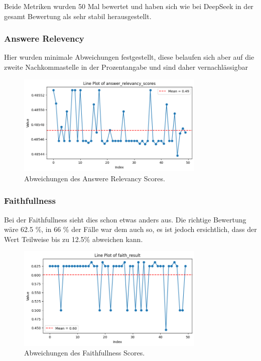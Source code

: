 Beide Metriken wurden 50 Mal bewertet und haben sich wie bei DeepSeek in der gesamt Bewertung als sehr stabil herausgestellt.


\subsubsection{Answere Relevency}
Hier wurden minimale Abweichungen festgestellt, diese belaufen sich aber auf die zweite Nachkommastelle in der Prozentangabe und sind daher vernachlässigbar

\begin{figure}[htbp]
    \centering
    \includegraphics[width=0.8\textwidth]{images/answer_relevancy.png}
    \caption{Abweichungen des Answere Relevancy Scores.}
    \label{fig:sample-image}
\end{figure}

\subsubsection{Faithfullness}
Bei der Faithfullness sieht dies schon etwas anders aus. Die richtige Bewertung wäre 62.5 \%, in 66 \% der Fälle war dem auch so, es ist jedoch ersichtlich, dass der Wert Teilweise bis zu 12.5\% abweichen kann.

\begin{figure}[htbp]
    \centering
    \includegraphics[width=0.8\textwidth]{images/faithfullness.png}
    \caption{Abweichungen des Faithfullness Scores.}
    \label{fig:sample-image}
\end{figure}

